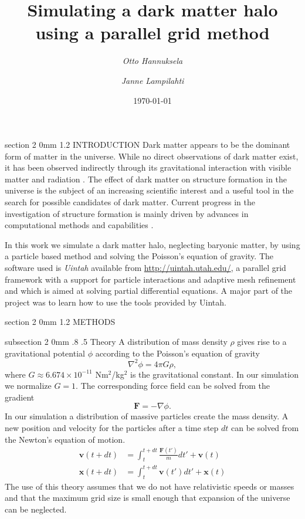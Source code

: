 \documentclass[notitlepage, 12pt]{article}
\title{Simulating a dark matter halo using a parallel grid method}
\author{{\em Otto Hannuksela} \and {\em Janne Lampilahti}}
\date{\today}
\makeatletter
\renewcommand{\section}{\@startsection       %
        {section}
        {2}
        {0mm}
        {1.2\baselineskip}
        {\baselineskip}
        {\centering\normalsize}}
\renewcommand{\subsection}{\@startsection    %
        {subsection}
        {2}
        {0mm}
        {.8\baselineskip}
        {.5\baselineskip}
        {\bfseries\normalsize}}
\makeatother
\begin{document}
\maketitle
\section{INTRODUCTION}
Dark matter appears to be the dominant form of matter in the universe. While no direct observations of dark matter exist, it has been observed indirectly through its gravitational interaction with visible matter and radiation \citep{Roos2010}. The effect of dark matter on structure formation in the universe is the subject of an increasing scientific interest and a useful tool in the search for possible candidates of dark matter. Current progress in the investigation of structure formation is mainly driven by advances in computational methods and capabilities \citep{Kuhlen2012}. 

In this work we simulate a dark matter halo, neglecting baryonic matter, by using a particle based method and solving the Poisson's equation of gravity. The software used is {\em Uintah} available from \url{http://uintah.utah.edu/}, a parallel grid framework with a support for particle interactions and adaptive mesh refinement and which is aimed at solving partial differential equations. A major part of the project was to learn how to use the tools provided by Uintah.

\section{METHODS}

\subsection{Theory}
A distribution of mass density $\rho$ gives rise to a gravitational potential $\phi$ according to the Poisson's equation of gravity
\begin{equation}
\nabla^2 \phi = 4\pi G \rho,
\end{equation}
where $G\approx 6.674\times10^{-11}$ Nm$^2$/kg$^2$ is the gravitational constant. In our simulation we normalize $G=1$. The corresponding force field can be solved from the gradient
\begin{equation}
\mathbf{F} = -\nabla \phi.
\end{equation}
In our simulation a distribution of massive particles create the mass density. A new position and velocity for the particles after a time step $dt$ can be solved from the Newton's equation of motion.
\begin{align}
\mathbf{v}(t+dt) &= \int_{t}^{t+dt}\frac{\mathbf{F}(t')}{m}dt' +  \mathbf{v}(t)\\
\mathbf{x}(t+dt) &= \int_{t}^{t+dt}\mathbf{v}(t')dt' +  \mathbf{x}(t)
\end{align}
The use of this theory assumes that we do not have relativistic speeds or masses and that the maximum grid size is small enough that expansion of the universe can be neglected.
\end{document}
